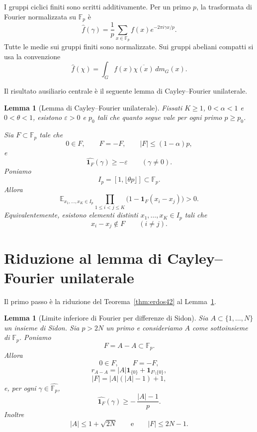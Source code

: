 \documentclass[11pt]{article}
\numberwithin{equation}{section}
\newtheorem{lemma}[theorem]{Lemma}
\newcommand{\E}{\mathbb E}
\newcommand{\F}{\mathbb F}
\newcommand{\1}{\mathbf 1}
\begin{document}
I gruppi ciclici finiti sono scritti additivamente. Per un primo \(p\), la trasformata di Fourier normalizzata su \(\F_p\) è
\[
        \widehat f(\gamma)
        =
        \frac1p\sum_{x\in\F_p}
        f(x)e^{-2\pi i\gamma x/p}.
\]
Tutte le medie sui gruppi finiti sono normalizzate. Sui gruppi abeliani compatti si usa la convenzione
\[
        \widehat f(\chi)=\int_G f(x)\overline{\chi(x)}\,dm_G(x).
\]

Il risultato ausiliario centrale è il seguente lemma di Cayley--Fourier unilaterale.

\begin{lemma}[Lemma di Cayley--Fourier unilaterale]
\label{lem:one-sided-cayley-fourier}
Fissati \(K\ge1\), \(0<\alpha<1\) e \(0<\theta<1\), esistono \(\varepsilon>0\) e \(p_0\) tali che quanto segue vale per ogni primo \(p\ge p_0\).

Sia \(F\subset\F_p\) tale che
\[
        0\in F,\qquad F=-F,\qquad |F|\le(1-\alpha)p,
\]
e
\[
        \widehat{\1_F}(\gamma)\ge-\varepsilon
        \qquad(\gamma\ne0).
\]
Poniamo
\[
        I_p=[1,\lfloor\theta p\rfloor]\subset\F_p.
\]
Allora
\[
        \E_{x_1,\ldots,x_K\in I_p}
        \prod_{1\le i<j\le K}
        \bigl(1-\1_F(x_i-x_j)\bigr)>0.
\]
Equivalentemente, esistono elementi distinti \(x_1,\ldots,x_K\in I_p\) tali che
\[
        x_i-x_j\notin F
        \qquad(i\ne j).
\]
\end{lemma}

\section{Riduzione al lemma di Cayley--Fourier unilaterale}

Il primo passo è la riduzione del Teorema~\ref{thm:erdos42} al Lemma~\ref{lem:one-sided-cayley-fourier}.

\begin{lemma}[Limite inferiore di Fourier per differenze di Sidon]
\label{lem:sidon-fourier-lower}
Sia \(A\subset\{1,\ldots,N\}\) un insieme di Sidon. Sia \(p>2N\) un primo e consideriamo \(A\) come sottoinsieme di \(\F_p\). Poniamo
\[
        F=A-A\subset\F_p.
\]
Allora
\[
        0\in F,\qquad F=-F,
\]
\[
        r_{A-A}=|A|\1_{\{0\}}+\1_{F\setminus\{0\}},
\]
\[
        |F|=|A|(|A|-1)+1,
\]
e, per ogni \(\gamma\in\widehat{\F_p}\),
\[
        \widehat{\1_F}(\gamma)
        \ge
        -\,\frac{|A|-1}{p}.
\]
Inoltre
\[
        |A|\le 1+\sqrt{2N}
        \qquad\text{e}\qquad
        |F|\le 2N-1.
\]
\end{lemma}
\end{document}
